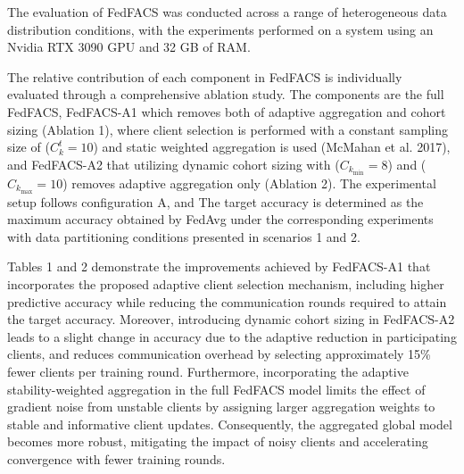 \documentclass[pdflatex,sn-mathphys-num,oneside]{sn-jnl}%
\theoremstyle{thmstyleone}%
\theoremstyle{thmstyletwo}%
\theoremstyle{thmstylethree}%
\begin{document}
The evaluation of FedFACS was conducted across a range of heterogeneous data distribution conditions, with the experiments performed on a system using an Nvidia RTX 3090 GPU and 32 GB of RAM.

The relative contribution of each component in FedFACS is individually evaluated through a comprehensive ablation study. The components are the full FedFACS, FedFACS-A1 which removes both of adaptive aggregation and cohort sizing (Ablation 1), where client selection is performed with a constant sampling size of ($C_k^t=10$) and static weighted aggregation is used (McMahan et al. 2017), and FedFACS-A2 that utilizing dynamic cohort sizing with ($C_{k_{\min}} = 8$) and ($C_{k_{\max}} = 10$) removes adaptive aggregation only (Ablation 2). The experimental setup follows configuration A, and The target accuracy is determined as the maximum accuracy obtained by FedAvg under the corresponding experiments with data partitioning conditions presented in scenarios 1 and 2.

Tables 1 and 2 demonstrate the improvements achieved by FedFACS-A1 that incorporates the proposed adaptive client selection mechanism, including higher predictive accuracy while reducing the communication rounds required to attain the target accuracy. Moreover, introducing dynamic cohort sizing in FedFACS-A2 leads to a slight change in accuracy due to the adaptive reduction in participating clients, and reduces communication overhead by selecting approximately 15\% fewer clients per training round. Furthermore, incorporating the adaptive stability-weighted aggregation in the full FedFACS model limits the effect of gradient noise from unstable clients by assigning larger aggregation weights to stable and informative client updates. Consequently, the aggregated global model becomes more robust, mitigating the impact of noisy clients and accelerating convergence with fewer training rounds.

\FloatBarrier

\FloatBarrier
\end{document}
